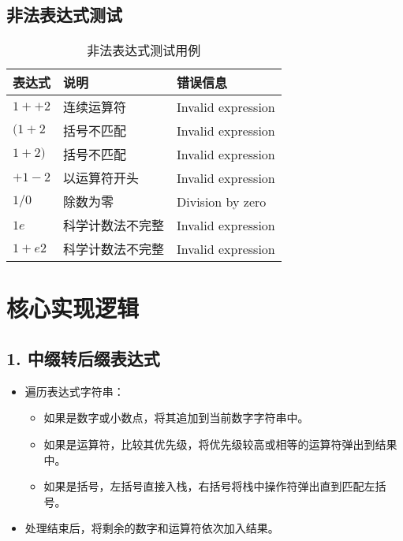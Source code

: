 \documentclass[12pt]{ctexart}
\begin{document}
\subsection*{非法表达式测试}

\begin{table}[h!]
\centering
\begin{tabular}{|l|l|l|}
\hline
\textbf{表达式} & \textbf{说明}          & \textbf{错误信息}      \\ \hline
$1++2$          & 连续运算符            & Invalid expression     \\ \hline
$(1+2$          & 括号不匹配            & Invalid expression     \\ \hline
$1+2)$          & 括号不匹配            & Invalid expression     \\ \hline
$+1-2$          & 以运算符开头          & Invalid expression     \\ \hline
$1/0$           & 除数为零              & Division by zero       \\ \hline
$1e$            & 科学计数法不完整      & Invalid expression     \\ \hline
$1+e2$          & 科学计数法不完整      & Invalid expression     \\ \hline
\end{tabular}
\caption{非法表达式测试用例}
\end{table}

\section*{核心实现逻辑}
\subsection*{1. 中缀转后缀表达式}
\begin{itemize}
    \item 遍历表达式字符串：
    \begin{itemize}
        \item 如果是数字或小数点，将其追加到当前数字字符串中。
        \item 如果是运算符，比较其优先级，将优先级较高或相等的运算符弹出到结果中。
        \item 如果是括号，左括号直接入栈，右括号将栈中操作符弹出直到匹配左括号。
    \end{itemize}
    \item 处理结束后，将剩余的数字和运算符依次加入结果。
\end{itemize}
\end{document}
